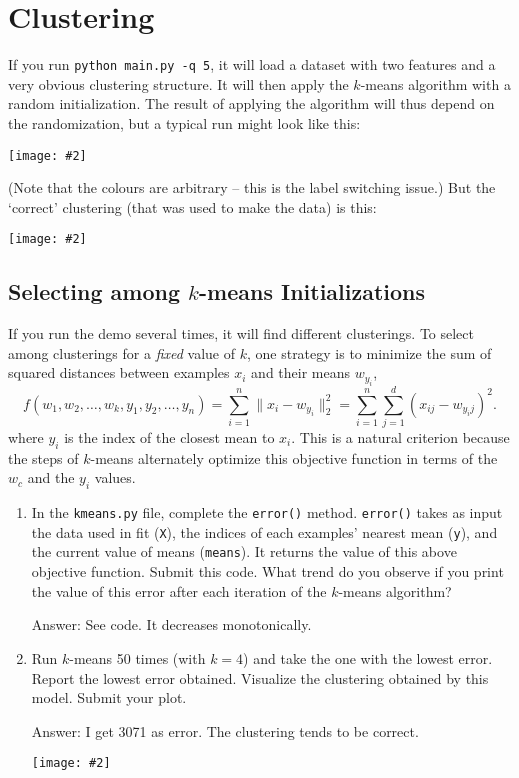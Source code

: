 \documentclass{article}
\def\ans#1{\par\gre{Answer: #1}}
\def\blu#1{{\color{blu}#1}}
\def\gre#1{{\color{gre}#1}}
\def\norm#1{\|#1\|}
\newcommand{\centerfig}[2]{\begin{center}\texttt{[image: \#2]}\end{center}}
\def\enum#1{\begin{enumerate}#1\end{enumerate}}
\begin{document}
	
	\section{Clustering}
	
	If you run \verb|python main.py -q 5|, it will load a dataset with two features
	and a very obvious clustering structure. It will then apply the $k$-means algorithm
	with a random initialization. The result of applying the
	algorithm will thus depend on the randomization, but a typical run might look like this:
	\centerfig{.5}{../figs/kmeans_basic.png}
	(Note that the colours are arbitrary -- this is the label switching issue.)
	But the `correct' clustering (that was used to make the data) is this:
	\centerfig{.5}{../figs/kmeans_good.png}
	
	
	\subsection{Selecting among $k$-means Initializations}
	
	If you run the demo several times, it will find different clusterings. To select among clusterings for a \emph{fixed} value of $k$, one strategy is to minimize the sum of squared distances between examples $x_i$ and their means $w_{y_i}$,
	\[
	f(w_1,w_2,\dots,w_k,y_1,y_2,\dots,y_n) = \sum_{i=1}^n \norm{x_i - w_{y_i}}_2^2 = \sum_{i=1}^n \sum_{j=1}^d (x_{ij} - w_{y_ij})^2.
	\]
	where $y_i$ is the index of the closest mean to $x_i$. This is a natural criterion because the steps of $k$-means alternately optimize this objective function in terms of the $w_c$ and the $y_i$ values.
	
	\blu{\enum{
			\item In the \texttt{kmeans.py} file, complete the \texttt{error()} method. \texttt{error()} takes as input the data used in fit (\texttt{X}), the indices of each examples' nearest mean (\texttt{y}), and the current value of means (\texttt{means}). It returns the value of this above objective function. Submit this code. What trend do you observe if you print the value of this error after each iteration of the $k$-means algorithm?
			\ans{See code. It decreases monotonically.}
			\item Run $k$-means 50 times (with $k=4$) and take the one with the lowest error. Report the lowest error obtained. Visualize the clustering obtained by this model. Submit your plot. 
			\ans{
				I get 3071 as error. The clustering tends to be correct.
				\centerfig{.5}{../figs/kmeans_50_inits.png} 
			}
	}}
	
\end{document}
